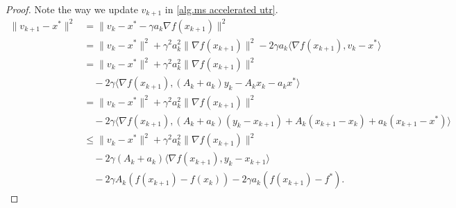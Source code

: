\documentclass{mcom-l}
\numberwithin{equation}{section}
\begin{document}
\begin{proof}
    Note the way we update $v_{k+1}$ in \cref{alg.ms accelerated utr}.
    \begin{align*}
        \|v_{k+1} - x^*\|^2
         & = \|v_k - x^* - \gamma a_k \nabla f(x_{k+1})\|^2                                       \\
         & = \|v_k - x^*\|^2 + \gamma^2 a_k^2 \|\nabla f(x_{k+1})\|^2
        - 2\gamma a_k \langle \nabla f(x_{k+1}), v_k - x^* \rangle                                \\
         & = \|v_k - x^*\|^2 + \gamma^2 a_k^2 \|\nabla f(x_{k+1})\|^2                             \\
         & \quad - 2\gamma \langle \nabla f(x_{k+1}), (A_k + a_k) y_k - A_k x_k - a_k x^* \rangle \\
         & = \|v_k - x^*\|^2 + \gamma^2 a_k^2 \|\nabla f(x_{k+1})\|^2                             \\
         & \quad - 2\gamma \langle \nabla f(x_{k+1}),
        (A_k + a_k)(y_k - x_{k+1}) + A_k(x_{k+1} - x_k)
        + a_k(x_{k+1} - x^*) \rangle                                                              \\
         & \leq \|v_k - x^*\|^2 + \gamma^2 a_k^2 \|\nabla f(x_{k+1})\|^2                          \\
         & \quad - 2\gamma (A_k + a_k) \langle \nabla f(x_{k+1}), y_k - x_{k+1} \rangle           \\
         & \quad - 2\gamma A_k \left(f(x_{k+1}) - f(x_k)\right)
        - 2\gamma a_k \left(f(x_{k+1}) - f^*\right).
    \end{align*}


\end{proof}
\end{document}
